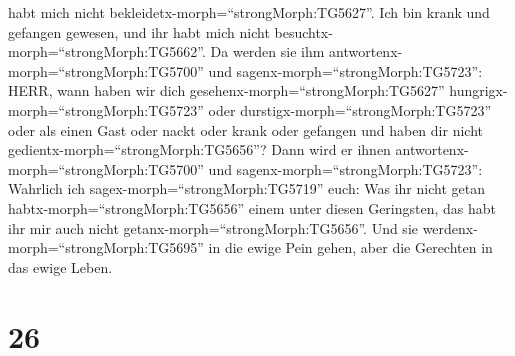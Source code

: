 habt mich nicht bekleidetx-morph=``strongMorph:TG5627''. Ich bin krank
und gefangen gewesen, und ihr habt mich nicht
besuchtx-morph=``strongMorph:TG5662''.  Da werden sie ihm
antwortenx-morph=``strongMorph:TG5700'' und
sagenx-morph=``strongMorph:TG5723'': HERR, wann haben wir dich
gesehenx-morph=``strongMorph:TG5627''
hungrigx-morph=``strongMorph:TG5723'' oder
durstigx-morph=``strongMorph:TG5723'' oder als einen Gast oder nackt
oder krank oder gefangen und haben dir nicht
gedientx-morph=``strongMorph:TG5656''?  Dann wird er ihnen
antwortenx-morph=``strongMorph:TG5700'' und
sagenx-morph=``strongMorph:TG5723'': Wahrlich ich
sagex-morph=``strongMorph:TG5719'' euch: Was ihr nicht getan
habtx-morph=``strongMorph:TG5656'' einem unter diesen Geringsten, das
habt ihr mir auch nicht getanx-morph=``strongMorph:TG5656''.
 Und sie werdenx-morph=``strongMorph:TG5695'' in die ewige
Pein gehen, aber die Gerechten in das ewige Leben.

\hypertarget{section-25}{%
\section{26}\label{section-25}}

